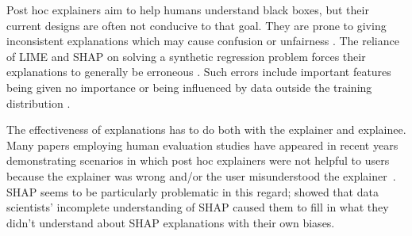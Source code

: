 \documentclass[11pt]{article}    %
\begin{document}
Post hoc explainers aim to help humans understand black boxes, but their current designs are often not conducive to that goal. They are prone to giving inconsistent explanations which may cause confusion \citep{Barocas20assumptions,bansal20sam,molnar2019,alvarez18robustness,laugel18defining,artelt21evaluating} or unfairness \citep{slack19adversarial}. The reliance of LIME and SHAP on solving a synthetic regression problem forces their explanations to generally be erroneous \citep{rahnama19shift,kumar20shap}. Such errors include important features being given no importance \citep{garreau20theoretical} or being influenced by data outside the training distribution \citep{kumar20shap}.

    
    
    
     The effectiveness of explanations has to do both with the explainer and explainee. Many papers employing human evaluation studies have appeared in recent years demonstrating scenarios in which post hoc explainers were not helpful to users because the explainer was wrong and/or the user misunderstood the explainer~\citep{Krishna2022TheDP,kumar20shap,weerts19human,dieber20assessing,yacoby22judges}. SHAP seems to be particularly problematic in this regard; \citep{kaur2020interpreting,passi18trust} showed that data scientists' incomplete understanding of SHAP caused them to fill in what they didn't understand about SHAP explanations with their own biases. %
    
\end{document}
